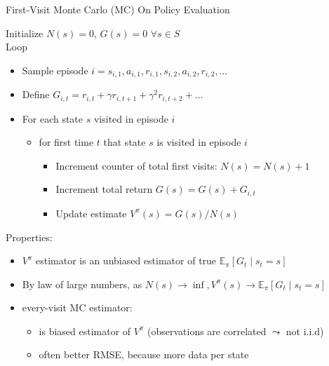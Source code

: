 \begin{frame}[c]{First-Visit Monte Carlo (MC) On Policy Evaluation}

Initialize $N(s) = 0$, $G(s) = 0$ $\forall s \in S$\\
Loop 
\begin{itemize}
	\item Sample episode $i = s_{i,1}, a_{i,1}, r_{i,1}, s_{i,2}, a_{i,2}, r_{i,2}, \ldots$
	\item Define $G_{i,t} = r_{i,t} + \gamma r_{i,t+1} + \gamma^2 r_{i,t+2} + \ldots$
	\item For each state $s$ visited in episode $i$
	\begin{itemize}
		\item for first time $t$ that state $s$ is visited in episode $i$
		\begin{itemize}
			\item Increment counter of total first visits: $N(s) = N(s) + 1$
			\item Increment total return $G(s) = G(s) + G_{i,t}$
			\item Update estimate $V^\pi (s) = G(s) /N(s)$
		\end{itemize}
	\end{itemize}
\end{itemize}

Properties:
\begin{itemize}
	\item $V^\pi$ estimator is an unbiased estimator of true $\mathbb{E}_\pi [G_t \mid s_t = s]$
	\item By law of large numbers, as $N(s) \to \inf, V^\pi(s) \to \mathbb{E}_\pi [G_t \mid s_t = s]$
	\item \alert{every}-visit MC estimator:
	\begin{itemize}
		\item is biased estimator of $V^\pi$ (observations are correlated $\leadsto$ not i.i.d)
		\item often better RMSE, because more data per state
	\end{itemize}

\end{itemize}

\end{frame}


